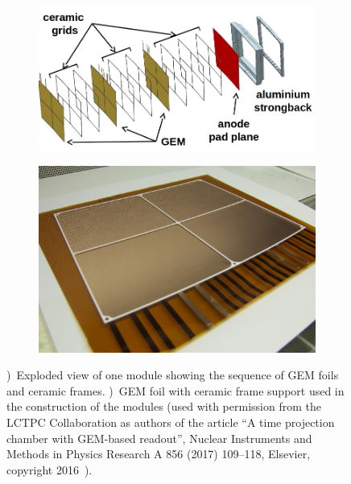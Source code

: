\begin{figure}
\begin{subfigure}[b]{0.52\textwidth}
\includegraphics[width=\textwidth]{Tracker/TPC_Bonn/plots/TPC-DG_GemModule_Explosion.png}
\caption{}
\label{sfig:moduleExp}
\end{subfigure}
\hfill
\begin{subfigure}[b]{0.44\textwidth}
\includegraphics[width=\textwidth]{Tracker/TPC_Bonn/plots/TPC-DG_GemGrid.png}
\caption{}
\label{sfig:moduleGEM}
\end{subfigure}
\caption [Readout Module GEM]{\small \protect{})~Exploded view of one module showing the sequence of GEM foils and ceramic frames. \protect{})~GEM foil with ceramic frame support used in the construction of the modules (used with permission from the LCTPC Collaboration as authors of the article ``A time projection chamber with GEM-based readout'', Nuclear Instruments and Methods in Physics Research A 856 (2017) 109–118, Elsevier, copyright 2016~\cite{FMueller2017}).}
\label{fig:moduleAssembled}
\end{figure}

